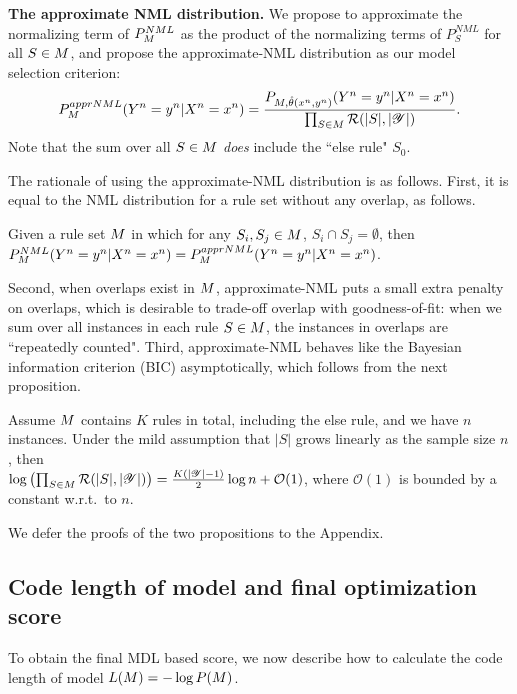 \smallskip
\noindent \textbf{The approximate NML distribution.}
We propose to approximate the normalizing term of $P^{NML}_{M}$ as the product of the normalizing terms of $P^{NML}_S$ for all $S \in M$, and propose the approximate-NML distribution as our model selection criterion:
\begin{equation}
    P^{apprNML}_{M}(Y^n =y^n | X^n=x^n) = \frac{P_{M, \hat{\theta}(x^n, y^n)}(Y^n=y^n|X^n=x^n)}{\prod_{S \in M} \mathcal{R}(|S|, |\mathscr{Y}|)}.
\end{equation}
Note that the sum over all $S \in M$ \emph{does} include the ``else rule" $S_0$. 

The rationale of using the approximate-NML distribution is as follows. First, it is equal to the NML distribution for a rule set without any overlap, as follows.
\begin{proposition}
Given a rule set $M$ in which for any $S_i, S_j \in M$, $S_i \cap S_j = \emptyset$, then $P^{NML}_{M}(Y^n=y^n|X^n=x^n) = P^{apprNML}_{M}(Y^n=y^n|X^n=x^n)$.
\end{proposition}

\noindent Second, when overlaps exist in $M$, approximate-NML puts a small extra penalty on overlaps, which is desirable to trade-off overlap with goodness-of-fit: when we sum over all instances in each rule $S \in M$, the instances in overlaps are ``repeatedly counted". Third, approximate-NML behaves like the Bayesian information criterion (BIC) asymptotically, which follows from the next proposition.
\begin{proposition}
Assume $M$ contains $K$ rules in total, including the else rule, and we have $n$ instances. Under the mild assumption that $|S|$ grows linearly as the sample size $n$, then \\
$\log \left(\prod_{S \in M} \mathcal{R}(|S|, |\mathscr{Y}|)\right) = \frac{K(|\mathscr{Y}| - 1)}{2} \log n + \mathcal{O}(1)$, where $\mathcal{O}(1)$ is bounded by a constant w.r.t.\ to $n$.
\end{proposition}
We defer the proofs of the two propositions to the Appendix. 

 \subsection{Code length of model and final optimization score}
 To obtain the final MDL based score, we now describe how to calculate the code length of model $L(M) = -\log P(M) $.

